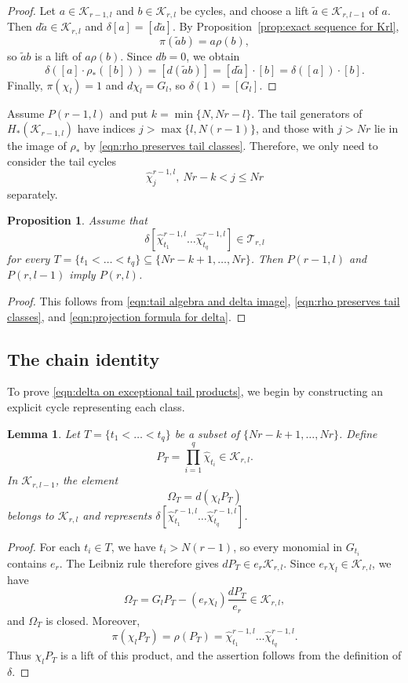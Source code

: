 \documentclass[reqno]{amsart}
\newtheorem{prop}[thm]{Proposition}
\newtheorem{lem}[thm]{Lemma}
\theoremstyle{definition}
\theoremstyle{remark}
\newcommand{\cat}{\mathcal{T}}
\newcommand{\cak}{\mathcal{K}}
\newcommand{\whc}{\widehat{\chi}}
\begin{document}
\begin{proof}
Let $a\in\cak_{r-1,l}$ and $b\in\cak_{r,l}$ be cycles, and choose a lift $\widetilde{a}\in\cak_{r,l-1}$ of $a$. Then $d\widetilde{a}\in\cak_{r,l}$ and $\delta[a]=[d\widetilde{a}]$. By Proposition~\ref{prop:exact sequence for Krl}, \[\pi(\widetilde{a} b)=a\rho(b),\]so $\widetilde{a} b$ is a lift of $a\rho(b)$. Since $db=0$, we obtain \[\delta([a]\cdot\rho_*([b]))=[d(\widetilde{a} b)]=[d\widetilde{a}]\cdot[b]=\delta([a])\cdot[b].\] Finally, $\pi(\chi_l)=1$ and $d\chi_l=G_l$, so $\delta(1)=[G_l]$.
\end{proof}

Assume $P(r-1,l)$ and put $k=\min\{N,Nr-l\}$. The tail generators of $H_*(\cak_{r-1,l})$ have indices $j>\max\{l,N(r-1)\}$, and those with $j>Nr$ lie in the image of $\rho_*$ by \eqref{eqn:rho preserves tail classes}. Therefore, we only need to consider the tail cycles \[\whc^{r-1,l}_j,\ Nr-k<j\le Nr\] separately.

\begin{prop}\label{prop:induction via delta}
Assume that \begin{equation}\label{eqn:delta on exceptional tail products}\delta\left[\whc_{t_1}^{r-1,l}\dots\whc_{t_q}^{r-1,l}\right]
\in\cat_{r,l}\end{equation}for every $T=\{t_1<\dots<t_q\}\subseteq\{Nr-k+1,\dots,Nr\}$. Then $P(r-1,l)$ and $P(r,l-1)$ imply $P(r,l)$.
\end{prop}
\begin{proof}
This follows from \eqref{eqn:tail algebra and delta image}, \eqref{eqn:rho preserves tail classes}, and \eqref{eqn:projection formula for delta}.
\end{proof}

\subsection{The chain identity}

To prove \eqref{eqn:delta on exceptional tail products}, we begin by constructing an explicit cycle representing each class.

\begin{lem}
Let $T=\{t_1<\dots<t_q\}$ be a subset of $\{Nr-k+1,\dots,Nr\}$. Define \[P_T=\prod_{i=1}^q\whc_{t_i}\in\cak_{r,l}.\] In $\cak_{r,l-1}$, the element
\[\Omega_T=d(\chi_lP_T)\]
belongs to $\cak_{r,l}$ and represents $\delta[\whc_{t_1}^{r-1,l}\dots\whc_{t_q}^{r-1,l}]$.
\end{lem}

\begin{proof}
For each $t_i\in T$, we have $t_i>N(r-1)$, so every monomial in $G_{t_i}$ contains $e_r$. The Leibniz rule therefore gives $dP_T\in e_r\cak_{r,l}$. Since $e_r\chi_l\in\cak_{r,l}$, we have
\[\Omega_T=G_lP_T-(e_r\chi_l)\frac{dP_T}{e_r}\in\cak_{r,l},\]
and $\Omega_T$ is closed. Moreover,
\[\pi(\chi_lP_T)=\rho(P_T)=\whc_{t_1}^{r-1,l}\dots\whc_{t_q}^{r-1,l}.\]
Thus $\chi_lP_T$ is a lift of this product, and the assertion follows from the definition of $\delta$.
\end{proof}
\end{document}

